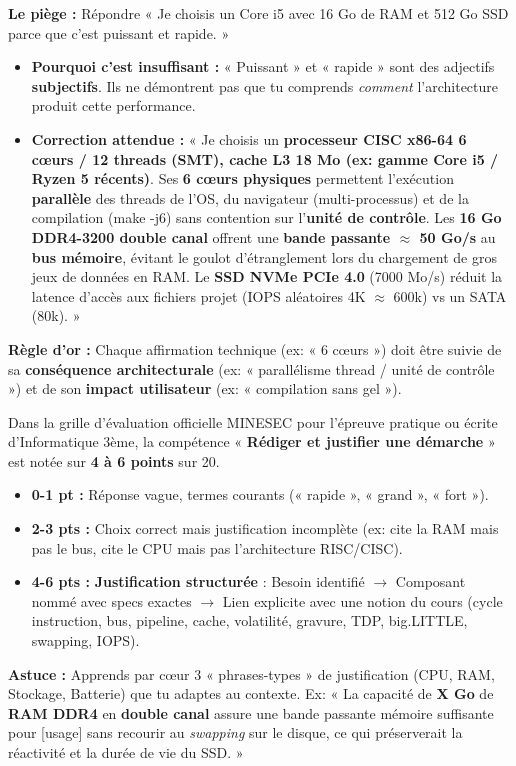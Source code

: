 \documentclass[11pt]{article}
\newcounter{popsec}
\newcounter{popsub}
\newcommand{\courssub}[1]{%
  \stepcounter{popsub}%
  \par\vspace{9pt}\noindent{\popxbold\fontsize{11.5}{13}\selectfont\color{popink}{\color{poporange}\thepopsec.\thepopsub}\hspace{6pt}#1}\par\nopagebreak\vspace{4pt}
}
\begin{document}
\courssub{Relire et vérifier sa justification}

\begin{attention}
\textbf{Le piège :} Répondre « Je choisis un Core i5 avec 16 Go de RAM et 512 Go SSD parce que c'est puissant et rapide. »
\begin{itemize}
    \item \textbf{Pourquoi c'est insuffisant :} « Puissant » et « rapide » sont des adjectifs \textbf{subjectifs}. Ils ne démontrent pas que tu comprends \emph{comment} l'architecture produit cette performance.
    \item \textbf{Correction attendue :} « Je choisis un \textbf{processeur CISC x86-64 6 cœurs / 12 threads (SMT), cache L3 18 Mo (ex: gamme Core i5 / Ryzen 5 récents)}. Ses \textbf{6 cœurs physiques} permettent l'exécution \textbf{parallèle} des threads de l'OS, du navigateur (multi-processus) et de la compilation (make -j6) sans contention sur l'\textbf{unité de contrôle}. Les \textbf{16 Go DDR4-3200 double canal} offrent une \textbf{bande passante $\approx$ 50 Go/s} au \textbf{bus mémoire}, évitant le goulot d'étranglement lors du chargement de gros jeux de données en RAM. Le \textbf{SSD NVMe PCIe 4.0} (7000 Mo/s) réduit la latence d'accès aux fichiers projet (IOPS aléatoires 4K $\approx$ 600k) vs un SATA (80k). »
\end{itemize}
\textbf{Règle d'or :} Chaque affirmation technique (ex: « 6 cœurs ») doit être suivie de sa \textbf{conséquence architecturale} (ex: « parallélisme thread / unité de contrôle ») et de son \textbf{impact utilisateur} (ex: « compilation sans gel »).
\end{attention}

\begin{savaistu}
Dans la grille d'évaluation officielle MINESEC pour l'épreuve pratique ou écrite d'Informatique 3ème, la compétence « \textbf{Rédiger et justifier une démarche} » est notée sur \textbf{4 à 6 points} sur 20.
\begin{itemize}
    \item \textbf{0-1 pt :} Réponse vague, termes courants (« rapide », « grand », « fort »).
    \item \textbf{2-3 pts :} Choix correct mais justification incomplète (ex: cite la RAM mais pas le bus, cite le CPU mais pas l'architecture RISC/CISC).
    \item \textbf{4-6 pts :} \textbf{Justification structurée} : Besoin identifié $\rightarrow$ Composant nommé avec specs exactes $\rightarrow$ Lien explicite avec une notion du cours (cycle instruction, bus, pipeline, cache, volatilité, gravure, TDP, big.LITTLE, swapping, IOPS).
\end{itemize}
\textbf{Astuce :} Apprends par cœur 3 « phrases-types » de justification (CPU, RAM, Stockage, Batterie) que tu adaptes au contexte. Ex: « La capacité de \textbf{X Go} de \textbf{RAM DDR4} en \textbf{double canal} assure une bande passante mémoire suffisante pour [usage] sans recourir au \emph{swapping} sur le disque, ce qui préserverait la réactivité et la durée de vie du SSD. »
\end{savaistu}
\end{document}
